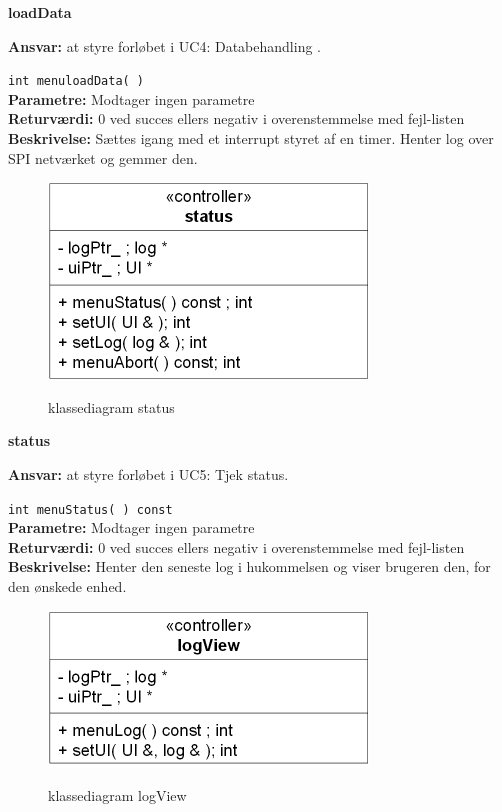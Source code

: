 {\centering
\textbf{loadData}\par
}
\textbf{Ansvar:} at styre forløbet i UC4: Databehandling . \

\verb+int menuloadData( )+ \\
\textbf{Parametre:} Modtager ingen parametre \\
\textbf{Returværdi:} 0 ved succes ellers negativ i overenstemmelse med fejl-listen \\
\textbf{Beskrivelse:} Sættes igang med et interrupt styret af en timer. Henter log over SPI netværket og gemmer den.\\

\begin{figure}[htbp] \centering
{\includegraphics[scale=1.5]{filer/design/Klassediagrammer/sw_status}}
\caption{klassediagram status}
\label{fig:status klassediagram}
\end{figure} 

\newpage

{\centering
\textbf{status}\par
}
\textbf{Ansvar:} at styre forløbet i UC5: Tjek status. \

\verb+int menuStatus( ) const+ \\
\textbf{Parametre:} Modtager ingen parametre \\
\textbf{Returværdi:} 0 ved succes ellers negativ i overenstemmelse med fejl-listen \\
\textbf{Beskrivelse:} Henter den seneste log i hukommelsen og viser brugeren den, for den ønskede enhed.\\

\begin{figure}[htbp] \centering
{\includegraphics[scale=1.5]{filer/design/Klassediagrammer/sw_logView}}
\caption{klassediagram logView}
\label{fig:logView klassediagram}
\end{figure}

